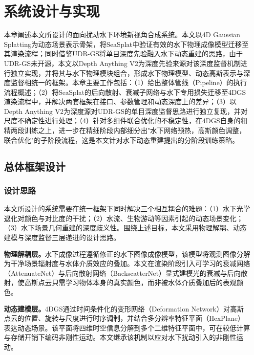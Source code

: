 \chapter{系统设计与实现}

本章阐述本文所设计的面向扰动水下环境新视角合成系统。本文以4D Gaussian Splatting为动态场景表示骨架，将SeaSplat中验证有效的水下物理成像模型迁移至其渲染流程；同时借鉴UDR-GS将单目深度先验融入水下动态重建的思路，由于UDR-GS未开源，本文以Depth Anything V2为深度先验来源对该深度监督机制进行独立实现，并将其与水下物理模块组合，形成水下物理模型、动态高斯表示与深度监督相统一的框架。本章主要工作包括：（1）给出整体管线（Pipeline）的执行流程概述；（2）将SeaSplat的后向散射、衰减子网络与水下专用损失迁移至4DGS渲染流程中，并解决两套框架在接口、参数管理和动态深度上的差异；（3）以Depth Anything V2为深度源对UDR-GS的单目深度监督思路进行独立复现，并对尺度不确定性进行处理；（4）针对多组件联合优化的不稳定性，在4DGS自身的粗精两段训练之上，进一步在精细阶段内部细分出"水下网络预热，高斯颜色调整，联合优化"的子阶段流程，这是本文针对水下动态重建提出的分阶段训练策略。

\section{总体框架设计}

\subsection{设计思路}

本文所设计的系统需要在统一框架下同时解决三个相互耦合的难题：（1）水下光学退化对颜色与对比度的干扰；（2）水流、生物游动等因素引起的动态场景变化；（3）水下场景几何重建的深度歧义性。围绕上述目标，本文采用物理解耦、动态建模与深度监督三层递进的设计思路。

\textbf{物理解耦层。}水下成像过程遵循修正的水下图像成像模型，该模型将观测图像分解为干净场景辐射度与水体介质效应的叠加。本文在渲染阶段引入可学习的衰减网络（AttenuateNet）与后向散射网络（BackscatterNet）显式建模光的衰减与后向散射，使高斯点云只需学习物体本身的真实颜色，而非被水体介质叠加后的表观颜色。

\textbf{动态建模层。}4DGS通过时间条件化的变形网络（Deformation Network）对高斯点云的位置、旋转与尺度进行时序调制，并结合多分辨率特征平面（HexPlane）表达动态场景。该平面将四维时空信息分解到多个二维特征平面中，可在较低计算与存储开销下编码非刚性运动。本文继承该机制以应对水下扰动引入的非刚性运动。

